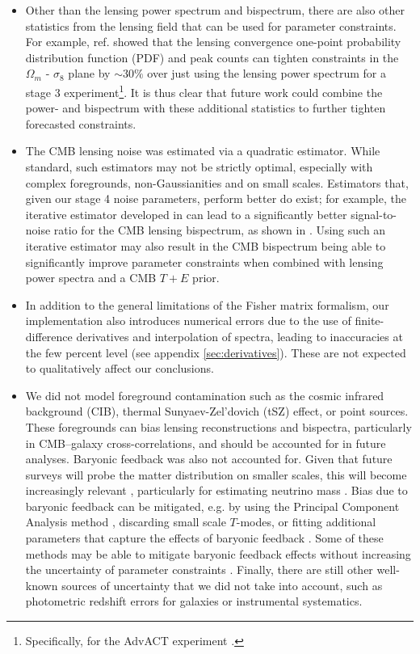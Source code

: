 \documentclass[11pt]{article} %
\begin{document}
\begin{itemize}
     \item Other than the lensing power spectrum and bispectrum, there are also other statistics from the lensing field that can be used for parameter constraints. For example, ref. \cite{Liu_2016} showed that the lensing convergence one-point probability distribution function (PDF) and peak counts can tighten constraints in the $\Omega_m$ - $\sigma_8$ plane by $\sim30\%$ over just using the lensing power spectrum for a stage 3 experiment\footnote{Specifically, for the AdvACT experiment \cite{Liu_2016}.}. It is thus clear that future work could combine the power- and bispectrum with these additional statistics to further tighten forecasted constraints.

    \item The CMB lensing noise was estimated via a quadratic estimator. While standard, such estimators may not be strictly optimal, especially with complex foregrounds, non-Gaussianities and on small scales. Estimators that, given our stage 4 noise parameters, perform better do exist; for example, the iterative estimator developed in \cite{Smith_2012} can lead to a significantly better signal-to-noise ratio for the CMB lensing bispectrum, as shown in \cite{Namikawa_2016}. Using such an iterative estimator may also result in the CMB bispectrum being able to significantly improve parameter constraints when combined with lensing power spectra and a CMB $T+E$ prior.

    \item In addition to the general limitations of the Fisher matrix formalism, our implementation also introduces numerical errors due to the use of finite-difference derivatives and interpolation of spectra, leading to inaccuracies at the few percent level (see appendix \ref{sec:derivatives}). These are not expected to qualitatively affect our conclusions.

    \item We did not model foreground contamination such as the cosmic infrared background (CIB), thermal Sunyaev-Zel'dovich (tSZ) effect, or point sources. These foregrounds can bias lensing reconstructions and bispectra, particularly in CMB–galaxy cross-correlations, and should be accounted for in future analyses. Baryonic feedback was also not accounted for. Given that future surveys will probe the matter distribution on smaller scales, this will become increasingly relevant \cite{McCarthy_2022}, particularly for estimating neutrino mass \cite{PhysRevD.101.063534}. Bias due to baryonic feedback can be mitigated, e.g. by using the Principal Component Analysis method \cite{s2024impactcosmologydependencebaryonic}, discarding small scale $T$-modes, or fitting additional parameters that capture the effects of baryonic feedback \cite{McCarthy_2022}. Some of these methods may be able to mitigate baryonic feedback effects without increasing the uncertainty of parameter constraints \cite{McCarthy_2021}. Finally, there are still other well-known sources of uncertainty that we did not take into account, such as photometric redshift errors for galaxies or instrumental systematics.


\end{itemize}
\end{document}
